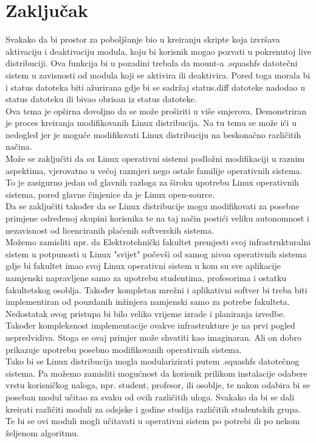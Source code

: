 \documentclass[12pt,vi]{mitthesis}
\begin{document}
\chapter*{Zaključak}
\indent
Svakako da bi prostor za poboljšanje bio u kreiranju skripte koja izvršava aktivaciju i deaktivaciju modula, koju bi korisnik mogao pozvati u pokrenutoj live distribuciji. Ova funkcija bi u pozadini trebala da mount-a .squashfs datotečni sistem u zavisnosti od modula koji se aktivira ili deaktivira. Pored toga morala bi i status datoteka biti ažurirana gdje bi se sadržaj status.diff datoteke nadodao u status datoteku ili bivao obrisan iz status datoteke.\\
Ova tema je opširna dovoljno da se može proširiti u više smjerova. Demonstriran je proces kreiranja modifikovanih Linux distribucija. Na tu temu se može ići u nedogled jer je moguće modifikovati Linux distribuciju na beskonačno različitih načina.\\
Može se zaključiti da su Linux operativni sistemi podložni modifikaciji u raznim aspektima, vjerovatno u većoj razmjeri nego ostale familije operativnih sistema. To je zasigurno jedan od glavnih razloga za široku upotrebu Linux operativnih sistema, pored glavne činjenice da je Linux open-source.\\
Da se zaključiti također da se Linux distribucije mogu modifikovati za posebne primjene određenoj skupini korisnika te na taj način postići veliku autonomnost i nezavisnost od licenciranih plaćenih softverskih sistema.\\
Možemo zamisliti npr. da Elektrotehnički fakultet premjesti svoj infrastrukturalni sistem u potpunosti u Linux "svijet" počevši od samog nivoa operativnih sistema gdje bi fakultet imao svoj Linux operativni sistem u kom su sve aplikacije namjenski napravljene samo za upotrebu studentima, profesorima i ostatku fakultetskog osoblja. Također kompletan mrežni i aplikativni softver bi treba biti implementiran od pouzdanih inžinjera namjenski samo za potrebe fakulteta.\\
Nedostatak ovog pristupa bi bilo veliko vrijeme izrade i planiranja izvedbe. Također kompleksnost implementacije ovakve infrastrukture je na prvi pogled nepredvidiva. Stoga se ovaj primjer može shvatiti kao imaginaran. Ali on dobro prikazuje upotrebu posebno modifikovanih operativnih sistema.\\
\indent
Tako bi se Linux distribucija mogla modularizirati putem .squashfs datotečnog sistema. Pa možemo zamisliti mogućnost da korisnik prilikom instalacije odabere vrstu korisničkog naloga, npr. student, profesor, ili osoblje, te nakon odabira bi se poseban modul učitao za svaku od ovih različitih uloga. Svakako da bi se dali kreirati različiti moduli za odsjeke i godine studija različitih studentskih grupa. Te bi se ovi moduli mogli učitavati u operativni sistem po potrebi ili po nekom željenom algoritmu.
\end{document}
